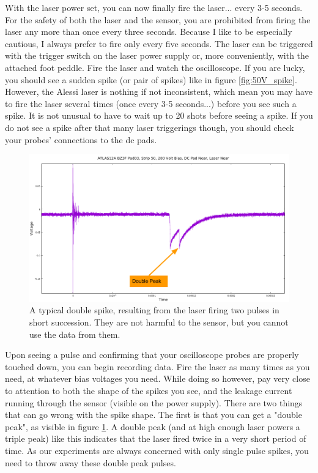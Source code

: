 \documentclass{report}
\begin{document}
            With the laser power set, you can now finally fire the laser... every 3-5 seconds. For the safety of both the laser and the sensor, you are prohibited from firing the laser any more than once every three seconds. Because I like to be especially cautious, I always prefer to fire only every five seconds. The laser can be triggered with the trigger switch on the laser power supply or, more conveniently, with the attached foot peddle. Fire the laser and watch the oscilloscope. If you are lucky, you should see a sudden spike (or pair of spikes) like in figure \ref{fig:50V_spike}. However, the Alessi laser is nothing if not inconsistent, which mean you may have to fire the laser several times (once every 3-5 seconds...) before you see such a spike. It is not unusual to have to wait up to 20 shots before seeing a spike. If you do not see a spike after that many laser triggerings though, you should check your probes' connections to the dc pads.

            \begin{figure}[h] 
                \includegraphics[height=.4\textheight]{double_peak}
                \centering
                \caption{ A typical double spike, resulting from the laser firing two pulses in short succession. They are not harmful to the sensor, but you cannot use the data from them. }
                \label{fig:double_peak}
            \end{figure}

            Upon seeing a pulse and confirming that your oscilloscope probes are properly touched down, you can begin recording data. Fire the laser as many times as you need, at whatever bias voltages you need. While doing so however, pay very close to attention to both the shape of the spikes you see, and the leakage current running through the sensor (visible on the power supply). There are two things that can go wrong with the spike shape. The first is that you can get a "double peak", as visible in figure \ref{fig:double_peak}. A double peak (and at high enough laser powers a triple peak) like this indicates that the laser fired twice in a very short period of time. As our experiments are always concerned with only single pulse spikes, you need to throw away these double peak pulses. 
\end{document}
